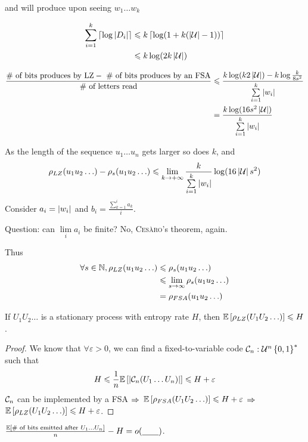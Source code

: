 and will produce upon seeing $w_1 \ldots w_k$ 

\[
    \begin{aligned}
        \sum\limits_{i=1}^k \left\lceil \log\left\lvert D_i\right\rvert \right\rceil &\leqslant k \left\lceil \log(1+k(\left\lvert\mathcal{U}\right\rvert-1)) \right\rceil\\
        &\leqslant k \log(2k\left\lvert\mathcal{U}\right\rvert)
    \end{aligned}
\]

\[
    \begin{aligned}
        \frac{ \text{\# of bits produces by LZ} - \text{ \# of bits produces by an FSA}}{\text{\# of letters read}} &\leqslant \frac{k \log(k2\left\lvert\mathcal{U}\right\rvert) - k \log \frac{k}{8s^2}}{\sum\limits_{i=1}^k \left\lvert w_i\right\rvert}\\
        &= \frac{k \log(16 s^2 \left\lvert\mathcal{U}\right\rvert)}{\sum\limits_{i=1}^k \left\lvert w_i\right\rvert}
    \end{aligned}
\]

As the length of the sequence $u_1\ldots u_n$ gets larger so does $k$, and
\[
    \rho_{LZ}(u_1u_2\ldots) - \rho_s(u_1u_2\ldots) \leqslant \lim\limits_{k\to+\infty} \frac{k}{\sum\limits_{i=1}^k \left\lvert w_i\right\rvert} \log (16\left\lvert\mathcal{U}\right\rvert s^2)
\]
Consider $a_i = \left\lvert w_i\right\rvert$ and $b_i = \frac{\sum\limits_{k=1}^ia_k}{i}$.

Question: can $\lim\limits_i a_i$ be finite? No, \textsc{Cesàro}'s theorem, again.


Thus
\[
    \begin{aligned}
        \forall s\in\mathbb{N}, \rho_{LZ}(u_1u_2\ldots) &\leqslant \rho_s(u_1u_2\ldots)\\
        &\leqslant \lim\limits_{s \to \infty} \rho_s(u_1u_2\ldots)\\
        &= \rho_{FSA}(u_1u_2\ldots)
    \end{aligned}
\]

\begin{corollary}
    If $U_1U_2\ldots$ is a stationary process with entropy rate $H$, then $\mathbb{E}\left[ \rho_{LZ}(U_1U_2\ldots) \right] \leqslant H$.
\end{corollary}
\begin{proof}
    We know that $\forall \varepsilon >0$, we can find a fixed-to-variable code $\mathcal{C}_n : \mathcal{U}^n \left\{ 0,1 \right\}^*$ such that
    \[
        H \leqslant \frac{1}{n} \mathbb{E}\left[ \left\lvert\mathcal{C}_n(U_1\ldots U_n)\right\rvert \right] \leqslant H + \varepsilon
    \]
    $\mathcal{C}_n$ can be implemented by a FSA $\Rightarrow$ $\mathbb{E}\left[ \rho_{FSA}(U_1U_2\ldots) \right] \leqslant H + \varepsilon$ $\Rightarrow$ $\mathbb{E}\left[ \rho_{LZ}(U_1U_2\ldots) \right] \leqslant H + \varepsilon $.
\end{proof}

$\frac{\mathbb{E}\left[ \text{\# of bits emitted after }U_1\ldots U_n \right]}{n} - H = o(\underline{\qquad})$.




